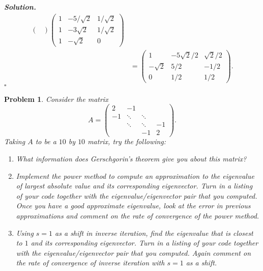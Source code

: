 \documentclass[12pt]{report}
\newtheorem{problem}{Problem}
\newenvironment{solution}[1][\it{Solution}]{\textbf{#1. } }{$\square$}
\begin{document}
\begin{solution}
\begin{align*}
\begin{pmatrix}
        \end{pmatrix} \begin{pmatrix}
            1 & - 5/\sqrt{2} & 1/\sqrt{2}\\
            1 & -3\sqrt{2} & 1/\sqrt{2}\\
            1 & -\sqrt{2} & 0
        \end{pmatrix}\\
        &= \begin{pmatrix}
            1 & -5\sqrt{2}/2 & \sqrt{2}/2\\
            -\sqrt{2} & 5/2 & -1/2\\
            0 & 1/2 & 1/2
        \end{pmatrix}.
    \end{align*}
\end{solution}

\newpage



\begin{problem}
    Consider the matrix
    \[ 
        A = \begin{pmatrix}
            2 & -1 & & \\
            -1& \ddots & \ddots &\\
            & \ddots & \ddots & -1\\
            & & -1 & 2
        \end{pmatrix}.
    \]
    Taking $A$ to be a $10$ by $10$ matrix, try the following:
    \begin{enumerate}
        \item [(a)]
        What information does Gerschgorin's theorem give you about this matrix?
        
        \item [(b)]
        Implement the power method to compute an approximation to the eigenvalue of
        largest absolute value and its corresponding eigenvector. Turn in a listing of your
        code together with the eigenvalue/eigenvector pair that you computed. Once you
        have a good approximate eigenvalue, look at the error in previous approximations
        and comment on the rate of convergence of the power method.
        
        \item [(c)]
        Using $s = 1$ as a shift in inverse iteration, find the eigenvalue that is closest to
        $1$ and its corresponding eigenvector. Turn in a listing of your code together with
        the eigenvalue/eigenvector pair that you computed. Again comment on the rate
        of convergence of inverse iteration with $s = 1$ as a shift.
    
    \end{enumerate}
\end{problem}
\end{document}
